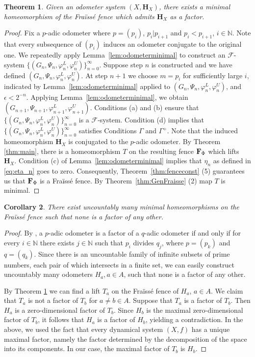 \documentclass[11pt]{amsart}
\newtheorem{theorem}{Theorem}[section]
\newtheorem{corollary}[theorem]{Corollary}
\newcommand{\N}{\mathbb{N}}  %
\newcommand{\fence}{{\bf F}_{\Phi}{}}
\newcommand{\homeocantor}{{\mathbf H}_{X}}
\newcommand{\cF}{\mathcal{F}}
\newcommand{\fsystem}{\{(G_n, \Psi_n,\varphi^L_n,\varphi^U_n)\}_{n=0}^{\infty}}
\begin{document}
{\begin{theorem}\label{thm:minimalfraisse} Given an odometer system $(X, \homeocantor)$, there exists a minimal homeomorphism of the Fra\"iss\'e fence which admits $\homeocantor$ as a factor.  
\end{theorem}
\begin{proof}
Fix a $p$-adic odometer where $p=(p_i)$, $p_i| p_{i+1}$ and $p_i<p_{i+1}$, $i\in\N$. Note that every subsequence of $(p_i)$ induces an odometer conjugate to the original one.
    We repeatedly apply Lemma~\ref{lem:odometerminimal} to construct an $\cF$-system $\fsystem$.  Suppose step $n$ is constructed and we have defined $(G_n, \Psi_n, \varphi ^L_n, \varphi^U_n)$. At step $n+1$ we choose $m=p_i$ for sufficiently large $i$, indicated by Lemma~\ref{lem:odometerminimal} applied to $(G_n, \Psi_n, \varphi ^L_n, \varphi^U_n)$, and $\epsilon <2^{-n}$. Applying Lemma~\ref{lem:odometerminimal}, we obtain  $(G_{n+1}, \Psi_{n+1}, \varphi ^L_{n+1}, \varphi^U_{n+1})$. Conditions (a) and (b) ensure that $\fsystem$ is a $\cF$-system. Condition (d) implies that $\fsystem$ satisfies Conditions $\Gamma$ and $\Gamma^+$. 
    Note that the induced homeomorphism $\homeocantor$ is conjugated to the $p$-adic odometer.
    By Theorem \ref{thm:main}, there is a homeomorphism  $T$ on the resulting fence $\fence$ which lifts $\homeocantor$. Condition (c) of Lemma~\ref{lem:odometerminimal} implies that $\eta_n$ as defined in \eqref{eq:eta_n} goes to zero. Consequently, Theorem~\ref{thm:fenceconst} (5) guarantees us that $\fence$ is a Fra\"iss\'e fence.  By Theorem~\ref{thm:GenFraisse} (2) map $T$ is minimal.
\end{proof}


\begin{corollary}\label{cor:Fraisse minimal}
There exist uncountably many minimal homeomorphisms on the Fra\"iss\'e fence such that none is a factor of any other.
\end{corollary}

\begin{proof}
By \cite[Proposition 4.5 (1)]{Kurka}, a $p$-adic odometer is a factor of a $q$-adic odometer if and only if for every $i\in\N$ there exists $j\in\N$ such that $p_i$ divides $q_j$, where $p=(p_k)$ and $q=(q_k)$. Since there is an uncountable family of infinite subsets of prime numbers, each pair of which intersects in a finite set, we can easily construct uncountably many odometers $H_a, a\in A$, such that none is a factor of any other. 

By Theorem \ref{thm:minimalfraisse} we can find a lift $T_a$ on the Fra\"iss\'e fence of $H_a$, $a\in A$. We claim that $T_a$ is not a factor of $T_b$ for $a\neq b\in A$.
Suppose that $T_a$ is a factor of $T_b$. Then $H_a$ is a zero-dimensional factor of $T_b$. Since $H_b$ is the maximal zero-dimensional factor of $T_b$, it follows that $H_a$ is a factor of $H_b$, yielding a contradiction. In the above, we used the fact that every dynamical system $(X,f)$ has a unique maximal factor, namely the factor determined by the decomposition of the space into its components. In our case, the maximal factor of $T_b$ is $H_b$. 
\end{proof}

}
\end{document}
